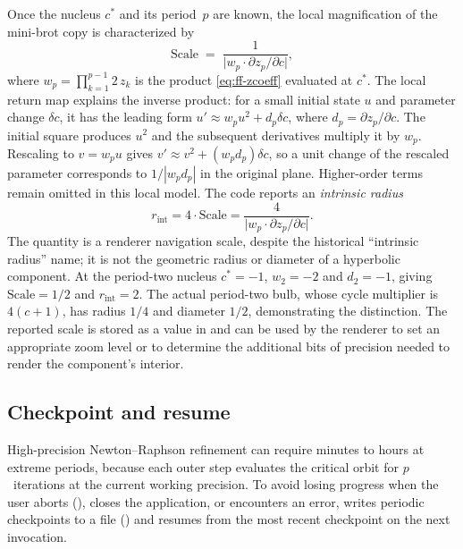 Once the nucleus $c^*$ and its period~$p$ are known, the local magnification
of the mini-brot copy is characterized by
\begin{equation}\label{eq:ff-scale}
\mathrm{Scale} \;=\;
  \frac{1}{\bigl|w_p \cdot \partial z_p/\partial c\bigr|},
\end{equation}
where $w_p = \prod_{k=1}^{p-1} 2\,z_k$ is the  product
\eqref{eq:ff-zcoeff} evaluated at $c^*$.  The local return map explains the
inverse product: for a small initial state $u$ and parameter change
$\delta c$, it has the leading form
$u'\approx w_pu^2+d_p\delta c$, where $d_p=\partial z_p/\partial c$.
The initial square produces $u^2$ and the subsequent derivatives multiply it
by $w_p$.  Rescaling to $v=w_pu$ gives
$v'\approx v^2+(w_pd_p)\delta c$, so a unit change of the rescaled
parameter corresponds to $1/|w_pd_p|$ in the original plane.  Higher-order
terms remain omitted in this local model.
The code reports an \emph{intrinsic radius}
\begin{equation}\label{eq:ff-intrinsic-radius}
r_{\mathrm{int}} = 4 \cdot \mathrm{Scale}
  = \frac{4}{\bigl|w_p \cdot \partial z_p/\partial c\bigr|}.
\end{equation}
The quantity is a renderer navigation scale, despite the historical
``intrinsic radius'' name; it is not the geometric radius or diameter of a
hyperbolic component.  At the period-two nucleus $c^*=-1$, $w_2=-2$ and
$d_2=-1$, giving $\mathrm{Scale}=1/2$ and $r_{\mathrm{int}}=2$.
The actual period-two bulb, whose cycle multiplier is $4(c+1)$, has
radius $1/4$ and diameter $1/2$, demonstrating
the distinction.  The reported scale is stored
as a  value in  and can be used by
the renderer to set an appropriate zoom level or to determine the additional
bits of precision needed to render the component's interior.

\subsection{Checkpoint and resume}
\label{subsec:ff-checkpoint}

High-precision Newton--Raphson refinement can require minutes to hours
at extreme periods, because each outer step evaluates the critical orbit
for $p$~iterations at the current working precision.  To avoid losing
progress when the user aborts (), closes the
application, or encounters an error, \FractalShark{} writes periodic
checkpoints to a file () and resumes from the
most recent checkpoint on the next invocation.

